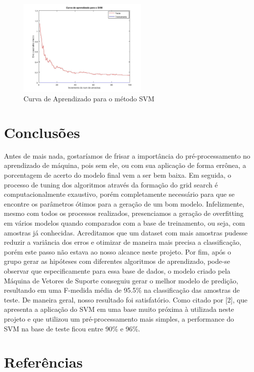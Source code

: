 \documentclass[10pt, conference, compsocconf]{IEEEtran}
\begin{document}
\begin{figure}[!t]
\centering
\includegraphics[width=2.5in]{imgs/SVMcurve}
\caption{Curva de Aprendizado para o método SVM}
\label{fig:svm_curve}
\end{figure}

\section{Conclusões}\label{sec:conclusao}
Antes de mais nada, gostaríamos de frisar a importância do pré-processamento no aprendizado de máquina, pois sem ele, ou com sua aplicação de forma errônea, a porcentagem de acerto do modelo final vem a ser bem baixa.
    Em seguida, o processo de tuning dos algoritmos através da formação do grid search é computacionalmente exaustivo, porém completamente necessário para que se encontre os parâmetros ótimos para a geração de um bom modelo. Infelizmente, mesmo com todos os processos realizados, presenciamos a geração de overfitting em vários modelos quando comparados com a base de treinamento, ou seja, com amostras já conhecidas. Acreditamos que um dataset com mais amostras pudesse reduzir a variância dos erros e otimizar de maneira mais precisa a classificação, porém este passo não estava ao nosso alcance neste projeto.
    Por fim, após o grupo gerar as hipóteses com diferentes algoritmos de aprendizado, pode-se observar que especificamente para essa base de dados, o modelo criado pela Máquina de Vetores de Suporte conseguiu gerar o melhor modelo de predição, resultando em uma F-medida média de 95.5\% na classificação das amostras de teste. De maneira geral, nosso resultado foi satisfatório. Como citado por [2], que apresenta a aplicação do SVM em uma base muito próxima à utilizada neste projeto e que utilizou um pré-processamento mais simples, a performance do SVM na base de teste ficou entre 90\% e 96\%.

\section{Referências}
\end{document}
